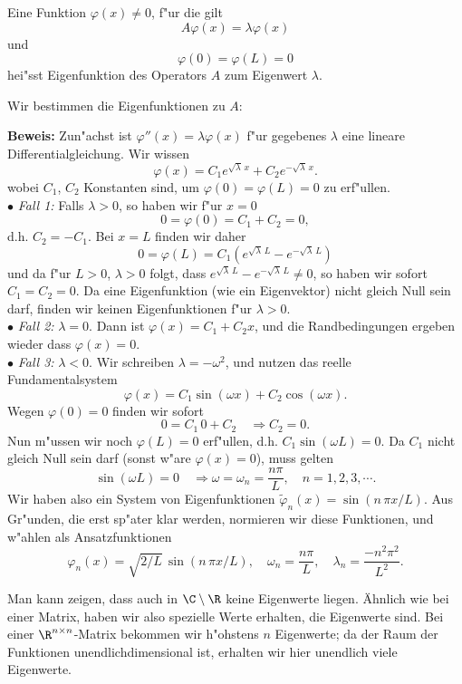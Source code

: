 \begin{sdefi} Eine Funktion $\varphi(x)\not = 0$, f"ur die gilt 
$$ A\varphi(x)  = \lambda \varphi(x)$$
und
$$ \varphi(0)=\varphi(L)=0$$
hei"ss{}t Eigenfunktion des Operators $A$
zum Eigenwert $\lambda$. 
\end{sdefi}


 Wir bestimmen die Eigenfunktionen zu $A$:\par\medskip
{}
\par\medskip
{\bf Beweis:}
Zun"achst ist $\varphi''(x)=\lambda\varphi(x)$ f"ur gegebenes $\lambda$
eine lineare Differentialgleichung. Wir wissen
$$ \varphi(x) = C_1 e^{\sqrt{\lambda}\, x}+ C_2e^{-\sqrt{\lambda}\, x}.$$
wobei $C_1$, $C_2$ Konstanten sind, um $\varphi(0)=\varphi(L)=0$ zu erf"ullen.\\
$\bullet$ {\it Fall 1:} Falls $\lambda>0$, so haben wir f"ur $x=0$
$$ 0=\varphi(0)= C_1+C_2=0,$$
d.h. $C_2=-C_1$. Bei $x=L$ finden wir daher
$$ 0 = \varphi(L) = C_1 (e^{\sqrt{\lambda}\, L}-e^{-\sqrt{\lambda}\, L})$$
und da f"ur $L>0$, $\lambda>0$ folgt, dass
$e^{\sqrt{\lambda}\, L}-e^{-\sqrt{\lambda}\, L}\not = 0$, so haben wir
sofort $C_1=C_2=0$. Da eine Eigenfunktion (wie ein Eigenvektor) nicht
gleich Null sein darf, finden wir keinen Eigenfunktionen f"ur $\lambda>0$. \\
$\bullet$ {\it Fall 2:} $\lambda =0$. Dann ist $\varphi(x) = C_1+C_2 x $, und
die Randbedingungen ergeben wieder dass $\varphi(x) = 0$.\\
$\bullet$ {\it Fall 3:} $\lambda<0$. Wir schreiben $\lambda = - \omega^2$, und
nutzen das reelle Fundamentalsystem
$$ \varphi(x) = C_1 \sin(\omega x) + C_2 \cos(\omega x).$$
Wegen $\varphi(0) = 0$ finden wir sofort 
$$ 0 = C_1\, 0 + C_2\quad\Rightarrow C_2 = 0.$$
 Nun m"ussen wir noch $\varphi(L)=0$ erf"ullen, d.h. $C_1\sin(\omega L)=0$. Da $C_1$ nicht gleich Null sein darf (sonst w"are $\varphi(x)=0$), muss gelten
 $$ \sin(\omega L) = 0 \quad\Rightarrow \omega =\omega_n= \frac{n\pi}{L},\quad n=1,2,3,\cdots.$$
 Wir haben also ein System von Eigenfunktionen $\tilde \varphi_n(x) = 
 \sin(n\,\pi x/L)$. Aus Gr"unden, die erst sp"ater klar werden, normieren wir diese Funktionen, und w"ahlen als Ansatzfunktionen
 $$ \varphi_n(x) = \sqrt{2/L}\, \sin(n\,\pi x/L), \quad
 \omega_n = \frac{n\pi}{L}, \quad\lambda_n =  \frac{- n^2\pi^2}{L^2}.$$


\begin{sbem}
Man kann zeigen, dass auch in $\C\setminus\R$ keine Eigenwerte liegen. 
\"Ahnlich wie bei einer Matrix, haben wir also spezielle Werte erhalten,
die Eigenwerte sind. Bei einer $\R^{n\times n}$-Matrix bekommen wir h"ohstens $n$ Eigenwerte; da der Raum der Funktionen unendlichdimensional ist, erhalten wir hier unendlich viele Eigenwerte.
\end{sbem}

